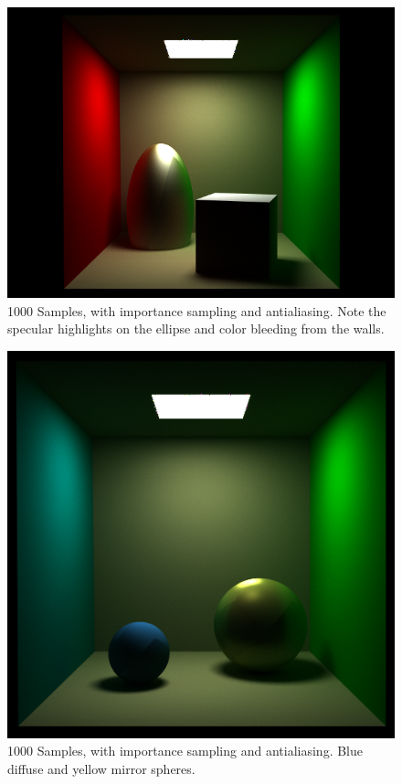 \documentclass[11pt]{article}
\begin{document}
\begin{figure}
	\begin{center}
		\includegraphics[width=.5\linewidth]{figs/specular_ellipse_1000samples}
		\caption{1000 Samples, with importance sampling and antialiasing. Note the specular highlights
		on the ellipse and color bleeding from the walls.}
	\end{center}
\end{figure}
\begin{figure}
	\begin{center}
		\includegraphics[width=.5\linewidth]{figs/2spheres_1000samples}
		\caption{1000 Samples, with importance sampling and antialiasing. Blue diffuse and yellow mirror spheres.}
	\end{center}
\end{figure}
\end{document}

